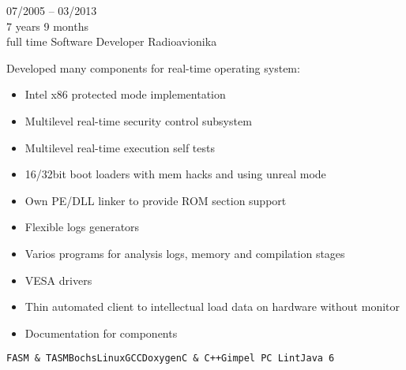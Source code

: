 \begin{entrylist}
    \entry
    {07/2005 -- 03/2013\\\footnotesize{7 years 9 months\\full time}}
    {Software Developer}
    {Radioavionika}
    {
        Developed many components for real-time operating system:
        \begin{itemize}[leftmargin=.2in]
        	\setlength\itemsep{0em}
            \item Intel x86 protected mode implementation
            \item Multilevel real-time security control subsystem
            \item Multilevel real-time execution self tests
            \item 16/32bit boot loaders with mem hacks and using unreal mode
            \item Own PE/DLL linker to provide ROM section support
            \item Flexible logs generators
            \item Varios programs for analysis logs, memory and compilation stages
            \item VESA drivers
            \item Thin automated client to intellectual load data on hardware without monitor
            \item Documentation for components
        \end{itemize}
    \texttt{FASM \& TASM}\slashsep\texttt{Bochs}\slashsep\texttt{Linux}\slashsep\texttt{GCC}\slashsep\texttt{Doxygen}\slashsep\texttt{C \& C++}\slashsep\texttt{Gimpel PC Lint}\slashsep\texttt{Java 6}}

\end{entrylist}

